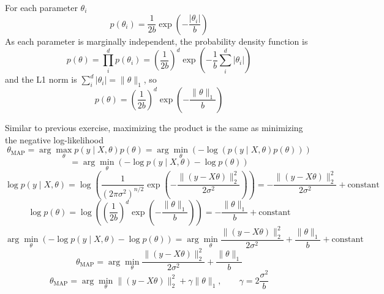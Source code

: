 \begin{answer}

For each parameter $\theta_{i}$
$$
p(\theta_{i}) = \frac{1}{2b} \exp\left( -\frac{|\theta_{i}|}{b} \right)
$$
As each parameter is marginally independent, the probability density function is 
$$
p(\theta) = \prod^{d}_{i}p(\theta_{i}) = \left( \frac{1}{2b}\right )^d \exp\left( -\frac{1}{b}\sum_{i}^d|\theta_{i}| \right)
$$
and the L1 norm is $\sum_{i}^d|\theta_{i}| = \|\theta\|_{1}$, so
$$
p(\theta) = \left( \frac{1}{2b}\right )^d\exp \left( -\frac{\|\theta\|_{1}}{b} \right)
$$

Similar to previous exercise, maximizing the product is the same as minimizing the negative log-likelihood
$$
\theta_{\text{MAP}}​ = \arg\max_{\theta} p(y \mid X, \theta) p(\theta) = \arg \min_{\theta} \left( -\log(p(y \mid X, \theta) p(\theta)) \right )
$$
$$
= \arg \min_{\theta} \left ( -\log​ p(y \mid X,\theta) - \log p(\theta) \right )
$$
$$
\log p(y \mid X, \theta) = \log \left(\frac{1}{(2\pi\sigma^2)^{n/2}} \exp\left( -\frac{\|(y-X \theta)\|_2^2}{2\sigma^{2}} \right) \right) = -\frac{\|(y-X \theta)\|_2^2}{2\sigma^{2}} + \text{constant}
$$
$$
\log p(\theta) = \log \left( (\frac{1}{2b})^d \exp\left( -\frac{\|\theta\|_1}{b} \right) \right) = -\frac{\|\theta\|_1}{b} + \text{constant}
$$
$$
\arg \min_{\theta} \left ( -\log​ p(y \mid X, \theta) - \log p(\theta) \right ) = \arg \min_{\theta} \frac{\|(y-X \theta)\|_2^2}{2\sigma^{2}} + \frac{\|\theta\|_1}{b} + \text{constant}
$$
$$
\theta_{\text{MAP}}​ = \arg \min_{\theta} \frac{\|(y-X \theta)\|_2^2}{2\sigma^{2}} + \frac{\|\theta\|_1}{b}
$$
$$
\boxed{ \theta_{\text{MAP}}​ = \arg \min_{\theta} \|(y-X \theta)\|_2^2 + \gamma\|\theta\|_1, \qquad \gamma = 2\frac{\sigma^{2}}{b}}
$$

\end{answer}
